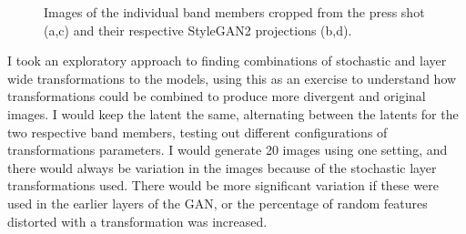 \begin{figure}[!htbp]
    \hfill
    \hfill
    \hfill
    \caption[0171 headshots cropped and projected into StyleGAN latent space]{Images of the individual band members cropped from the press shot (a,c) and their respective StyleGAN2 projections (b,d). }
    \label{fig:c7:0171-crop-embed}
 \end{figure}

I took an exploratory approach to finding combinations of stochastic and layer wide transformations to the models, using this as an exercise to understand how transformations could be combined to produce more divergent and original images. 
I would keep the latent the same, alternating between the latents for the two respective band members, testing out different configurations of transformations parameters. 
I would generate 20 images using one setting, and there would always be variation in the images because of the stochastic layer transformations used. 
There would be more significant variation if these were used in the earlier layers of the GAN, or the percentage of random features distorted with a transformation was increased.

